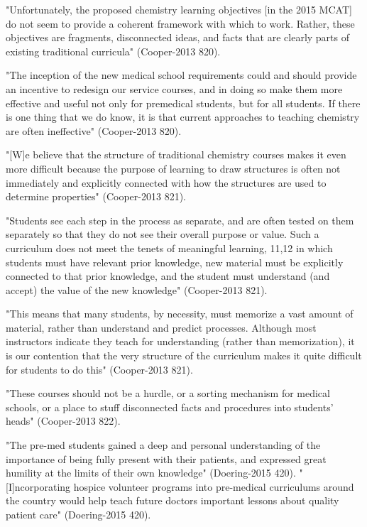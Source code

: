"Unfortunately, the proposed chemistry learning objectives [in the 2015 MCAT] do not seem to provide a coherent framework with which to work. Rather, these objectives are fragments, disconnected ideas, and facts that are clearly parts of existing traditional curricula" (Cooper-2013 820).

"The inception of the new medical school requirements could and should provide an incentive to redesign our service courses, and in doing so make them more effective and usefulnot only for premedical students, but for all students. If there is one thing that we do know, it is that current approaches to teaching chemistry are often ineffective" (Cooper-2013 820).

"[W]e believe that the structure of traditional chemistry courses makes it even more difficult because the purpose of learning to draw structures is often not immediately and explicitly connected with how the structures are used to determine properties" (Cooper-2013 821).

"Students see each step in the process as separate, and are often tested on them separately so that they do not see their overall purpose or value. Such a curriculum does not meet the tenets of meaningful learning, 11,12 in which students must have relevant prior knowledge, new material must be explicitly connected to that prior knowledge, and the student must understand (and accept) the value of the new knowledge" (Cooper-2013 821).

"This means that many students, by necessity, must memorize a vast amount of material, rather than understand and predict processes. Although most instructors indicate they teach for understanding (rather than memorization), it is our contention that the very structure of the curriculum makes it quite difficult for students to do this" (Cooper-2013 821).

"These courses should not be a hurdle, or a sorting mechanism for medical schools, or a place to stuff disconnected facts and procedures into students’ heads" (Cooper-2013 822).


"The pre-med students gained a deep and
personal understanding of the importance of being fully present with their patients, and expressed great humility at the limits of their own knowledge" (Doering-2015 420).
"[I]ncorporating hospice volunteer programs into pre-medical curriculums around the country would help teach future doctors important lessons about quality patient care" (Doering-2015 420).


